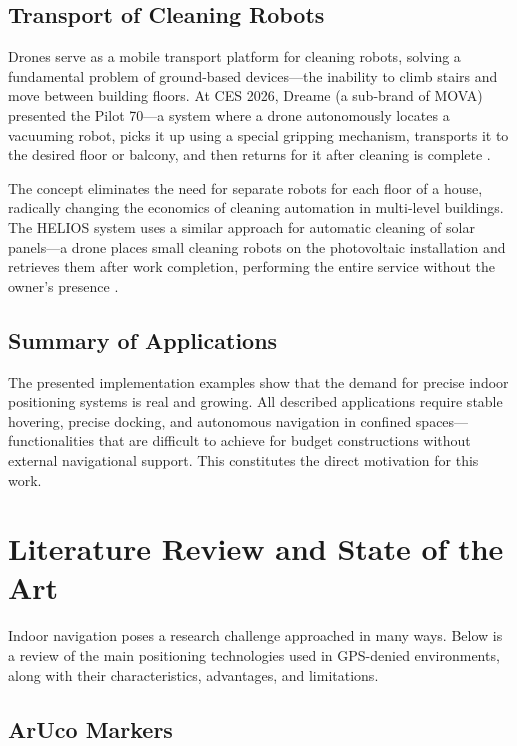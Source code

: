 \documentclass{EE-dyplom}
\begin{document}
\subsection{Transport of Cleaning Robots}

Drones serve as a mobile transport platform for cleaning robots, solving a fundamental problem of ground-based devices—the inability to climb stairs and move between building floors. At CES 2026, Dreame (a sub-brand of MOVA) presented the Pilot 70—a system where a drone autonomously locates a vacuuming robot, picks it up using a special gripping mechanism, transports it to the desired floor or balcony, and then returns for it after cleaning is complete \cite{cnet2026}.

The concept eliminates the need for separate robots for each floor of a house, radically changing the economics of cleaning automation in multi-level buildings. The HELIOS system uses a similar approach for automatic cleaning of solar panels—a drone places small cleaning robots on the photovoltaic installation and retrieves them after work completion, performing the entire service without the owner's presence \cite{artrobotics2025}.

\subsection{Summary of Applications}

The presented implementation examples show that the demand for precise indoor positioning systems is real and growing. All described applications require stable hovering, precise docking, and autonomous navigation in confined spaces—functionalities that are difficult to achieve for budget constructions without external navigational support. This constitutes the direct motivation for this work.

\section{Literature Review and State of the Art}

Indoor navigation poses a research challenge approached in many ways. Below is a review of the main positioning technologies used in GPS-denied environments, along with their characteristics, advantages, and limitations.

\subsection{ArUco Markers}
\end{document}
